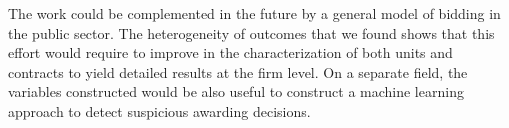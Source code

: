 The work could be complemented in the future by a general model of bidding in the public sector. The heterogeneity of outcomes that we found shows that this effort would require to improve in the characterization of both units and contracts to yield detailed results at the firm level. On a separate field, the variables constructed would be also useful to construct a machine learning approach to detect suspicious awarding decisions.
